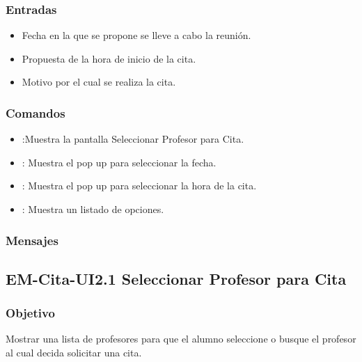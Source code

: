 \subsubsection{Entradas}

\begin{itemize}
	
	\item Fecha en la que se propone se lleve a cabo la reunión.
	\item Propuesta de la hora de inicio de la cita.
	\item Motivo por el cual se realiza la cita.
\end{itemize}

\subsubsection{Comandos}
\begin{itemize}
	\item {}:Muestra la pantalla Seleccionar Profesor para Cita.
	\item {}: Muestra el pop up para seleccionar la fecha.
	\item {}: Muestra el pop up para seleccionar la hora de 
	la cita.
	\item {}: Muestra un listado de opciones.
\end{itemize}

\subsubsection{Mensajes}
\begin{Citemize}
	\item {}
	\item {}
\end{Citemize}

\pagebreak

\subsection{EM-Cita-UI2.1 Seleccionar Profesor para Cita }

\subsubsection{Objetivo}
	\noindent
	Mostrar una lista de profesores para que el alumno seleccione o busque el profesor al cual decida solicitar una cita.


